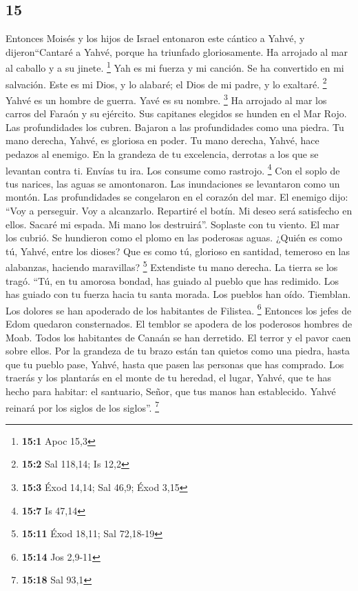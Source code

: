 \begin{paracol}{2}
\hypertarget{section-28}{%
\section{15}\label{section-28}}

 Entonces Moisés y los hijos de Israel entonaron este
cántico a Yahvé, y dijeron``Cantaré a Yahvé, porque ha triunfado
gloriosamente. Ha arrojado al mar al caballo y a su jinete. \footnote{\textbf{15:1}
  Apoc 15,3}  Yah es mi fuerza y mi canción. Se ha
convertido en mi salvación. Este es mi Dios, y lo alabaré; el Dios de mi
padre, y lo exaltaré. \footnote{\textbf{15:2} Sal 118,14; Is 12,2}
 Yahvé es un hombre de guerra. Yavé es su nombre.
\footnote{\textbf{15:3} Éxod 14,14; Sal 46,9; Éxod 3,15} 
Ha arrojado al mar los carros del Faraón y su ejército. Sus capitanes
elegidos se hunden en el Mar Rojo.  Las profundidades los
cubren. Bajaron a las profundidades como una piedra.  Tu
mano derecha, Yahvé, es gloriosa en poder. Tu mano derecha, Yahvé, hace
pedazos al enemigo.  En la grandeza de tu excelencia,
derrotas a los que se levantan contra ti. Envías tu ira. Los consume
como rastrojo. \footnote{\textbf{15:7} Is 47,14}  Con el
soplo de tus narices, las aguas se amontonaron. Las inundaciones se
levantaron como un montón. Las profundidades se congelaron en el corazón
del mar.  El enemigo dijo: ``Voy a perseguir. Voy a
alcanzarlo. Repartiré el botín. Mi deseo será satisfecho en ellos.
Sacaré mi espada. Mi mano los destruirá''.  Soplaste con
tu viento. El mar los cubrió. Se hundieron como el plomo en las
poderosas aguas.  ¿Quién es como tú, Yahvé, entre los
dioses? Que es como tú, glorioso en santidad, temeroso en las alabanzas,
haciendo maravillas? \footnote{\textbf{15:11} Éxod 18,11; Sal 72,18-19}
 Extendiste tu mano derecha. La tierra se los tragó.
 ``Tú, en tu amorosa bondad, has guiado al pueblo que has
redimido. Los has guiado con tu fuerza hacia tu santa morada.
 Los pueblos han oído. Tiemblan. Los dolores se han
apoderado de los habitantes de Filistea. \footnote{\textbf{15:14} Jos
  2,9-11}  Entonces los jefes de Edom quedaron
consternados. El temblor se apodera de los poderosos hombres de Moab.
Todos los habitantes de Canaán se han derretido.  El
terror y el pavor caen sobre ellos. Por la grandeza de tu brazo están
tan quietos como una piedra, hasta que tu pueblo pase, Yahvé, hasta que
pasen las personas que has comprado.  Los traerás y los
plantarás en el monte de tu heredad, el lugar, Yahvé, que te has hecho
para habitar: el santuario, Señor, que tus manos han establecido.
 Yahvé reinará por los siglos de los siglos''.
\footnote{\textbf{15:18} Sal 93,1}


\end{paracol}
